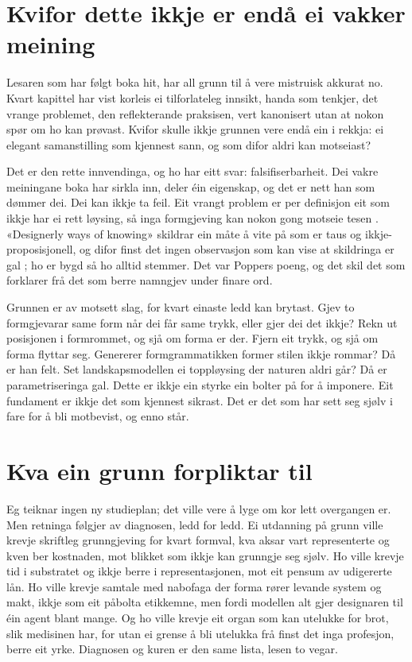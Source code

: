 \section{Kvifor dette ikkje er endå ei vakker meining}

Lesaren som har følgt boka hit, har all grunn til å vere mistruisk akkurat no. Kvart kapittel har vist korleis ei tilforlateleg innsikt, handa som tenkjer, det vrange problemet, den reflekterande praksisen, vert kanonisert utan at nokon spør om ho kan prøvast. Kvifor skulle ikkje grunnen vere endå ein i rekkja: ei elegant samanstilling som kjennest sann, og som difor aldri kan motseiast?

Det er den rette innvendinga, og ho har eitt svar: falsifiserbarheit. Dei vakre meiningane boka har sirkla inn, deler éin eigenskap, og det er nett han som dømmer dei. Dei kan ikkje ta feil. Eit vrangt problem er per definisjon eit som ikkje har ei rett løysing, så inga formgjeving kan nokon gong motseie tesen \autocite{buchanan1992wicked}. «Designerly ways of knowing» skildrar ein måte å vite på som er taus og ikkje-proposisjonell, og difor finst det ingen observasjon som kan vise at skildringa er gal \autocite{cross2006}; ho er bygd så ho alltid stemmer. Det var Poppers poeng, og det skil det som forklarer frå det som berre namngjev under finare ord.

Grunnen er av motsett slag, for kvart einaste ledd kan brytast. Gjev to formgjevarar same form når dei får same trykk, eller gjer dei det ikkje? Rekn ut posisjonen i formrommet, og sjå om forma er der. Fjern eit trykk, og sjå om forma flyttar seg. Genererer formgrammatikken former stilen ikkje rommar? Då er han felt. Set landskapsmodellen ei toppløysing der naturen aldri går? Då er parametriseringa gal. Dette er ikkje ein styrke ein bolter på for å imponere. Eit fundament er ikkje det som kjennest sikrast. Det er det som har sett seg sjølv i fare for å bli motbevist, og enno står.

\section{Kva ein grunn forpliktar til}

Eg teiknar ingen ny studieplan; det ville vere å lyge om kor lett overgangen er. Men retninga følgjer av diagnosen, ledd for ledd. Ei utdanning på grunn ville krevje skriftleg grunngjeving for kvart formval, kva aksar vart representerte og kven ber kostnaden, mot blikket som ikkje kan grunngje seg sjølv. Ho ville krevje tid i substratet og ikkje berre i representasjonen, mot eit pensum av udigererte lån. Ho ville krevje samtale med nabofaga der forma rører levande system og makt, ikkje som eit påbolta etikkemne, men fordi modellen alt gjer designaren til éin agent blant mange. Og ho ville krevje eit organ som kan utelukke for brot, slik medisinen har, for utan ei grense å bli utelukka frå finst det inga profesjon, berre eit yrke. Diagnosen og kuren er den same lista, lesen to vegar.

